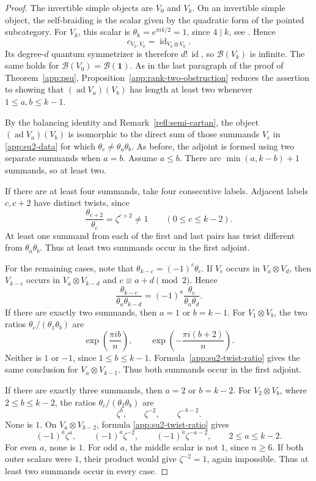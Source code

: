\documentclass[11pt, a4paper]{article}
\numberwithin{equation}{section}
\newcommand{\B}{\mathcal B}
\newcommand{\one}{\mathbf 1}
\DeclareMathOperator{\id}{id}
\DeclareMathOperator{\ad}{ad}
\begin{document}
\begin{proof}
The invertible simple objects are $V_0$ and $V_k$.
 {On an invertible simple object, the self-braiding is
the scalar given by the quadratic form of the pointed subcategory.
For $V_k$, this scalar is $\theta_k=e^{\pi i k/2}=1$, since $4\mid k$,
see \cite[Sections~3.1--3.2 and Example~5.1, (5.5)]{GMR24}. Hence}
\[
  {c_{V_k,V_k}=\id_{V_k\otimes V_k}.}
\]
 {Its degree-$d$ quantum symmetrizer is therefore
$d!\,\id$, so $\B(V_k)$ is infinite. The same holds for
$\B(V_0)=\B(\one)$.}
As in the last paragraph of the proof of Theorem~\ref{app:psu},
Proposition~\ref{app:rank-two-obstruction} reduces the assertion
to showing that $(\ad V_a)(V_b)$ has length at least two whenever
$1\le a,b\le k-1$.

By  {the balancing identity} and Remark~\ref{refl:semi-cartan}, the object  {$(\ad V_a)(V_b)$} is isomorphic to the direct sum of those summands $V_c$ in
\eqref{app:su2-data} for which $\theta_c\ne\theta_a\theta_b$.
As before, the adjoint is formed using two separate summands
when $a=b$.
Assume $a\le b$. There are $\min(a,k-b)+1$  summands,
so at least two.

If there are at least four summands, take four consecutive
labels. Adjacent labels $c,c+2$ have distinct twists, since
\[
 \frac{\theta_{c+2}}{\theta_c}=\zeta^{c+2}\ne1
 \qquad(0\le c\le k-2).
\]
At least one summand from each of the first and last pairs
has twist different from $\theta_a\theta_b$.
Thus at least two summands occur in the first adjoint.

For the remaining cases, note that
$\theta_{k-c}=(-1)^c\theta_c$.
If $V_c$ occurs in $V_a\otimes V_d$, then $V_{k-c}$ occurs
in $V_a\otimes V_{k-d}$ and $c\equiv a+d\pmod2$. Hence
\begin{equation}\label{app:su2-twist-ratio}
 \frac{\theta_{k-c}}{\theta_a\theta_{k-d}}
 =(-1)^a\frac{\theta_c}{\theta_a\theta_d}.
\end{equation}
If there are exactly two summands, then $a=1$ or $b=k-1$.
For $V_1\otimes V_b$, the two ratios
$\theta_c/(\theta_1\theta_b)$ are
\[
 \exp\!\left(\frac{\pi i b}{n}\right),
 \qquad
 \exp\!\left(-\frac{\pi i(b+2)}{n}\right).
\]
Neither is $1$ or $-1$, since $1\le b\le k-1$.
Formula~\eqref{app:su2-twist-ratio} gives the same conclusion
for $V_a\otimes V_{k-1}$. Thus both summands occur in the
first adjoint.

If there are exactly three summands, then $a=2$ or $b=k-2$.
For $V_2\otimes V_b$, where $2\le b\le k-2$, the ratios
$\theta_c/(\theta_2\theta_b)$ are
\[
 \zeta^b,\qquad \zeta^{-2},\qquad \zeta^{-b-2}.
\]
None is $1$. On $V_a\otimes V_{k-2}$, formula
\eqref{app:su2-twist-ratio} gives
\[
 (-1)^a\zeta^a,\qquad
 (-1)^a\zeta^{-2},\qquad
 (-1)^a\zeta^{-a-2},
 \qquad 2\le a\le k-2.
\]
For even $a$, none is $1$. For odd $a$, the middle scalar
is not $1$, since $n\ge6$. If both outer scalars were $1$,
their product would give $\zeta^{-2}=1$, again impossible.
Thus at least two summands occur in every case.


\end{proof}
\end{document}
